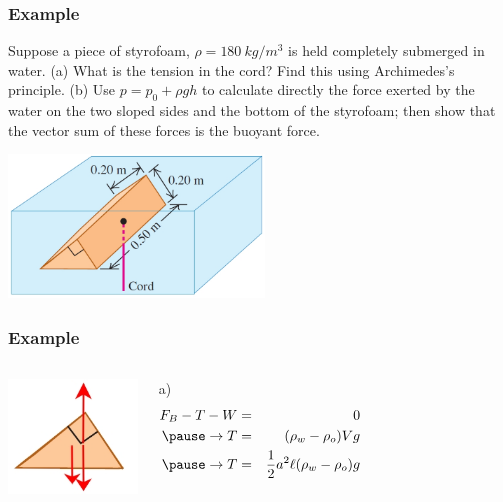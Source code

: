 \documentclass[]{beamer}
\begin{document}
\begin{frame}
\frametitle{Example \theexample}


Suppose a piece of styrofoam, $\rho=180~kg/m^3$ is
held completely submerged in water. (a) What is the
tension in the cord? Find this using Archimedes’s principle.
(b) Use $p=p_0+\rho g h$ to calculate directly the force exerted by
the water on the two sloped sides and the bottom of the styrofoam;
then show that the vector sum of these forces is the buoyant
force.

  \begin{center}
  \includegraphics[height=1.5in]{images2/example_12.97.jpg}
\end{center}

  \end{frame}


\begin{frame}
\frametitle{Example \theexample}







\begin{columns}[c]
  \column{2in}  %

  \begin{center}
    \includegraphics[height=1.2in]{images2/example_12.97b.jpg}
  \end{center}
  

  \column{2in}
  
  a)
  \textcolor{mypink1}{
  \begin{eqnarray*}
   F_B-T-W&=&0\\
   \pause
   \rightarrow T&=&(\rho_w -\rho_o) V g\\
   \pause
   \rightarrow T&=&\frac{1}{2}a^2\ell(\rho_w -\rho_o)g\\
  \end{eqnarray*}
  }
  \end{columns}





  \end{frame}
\end{document}
